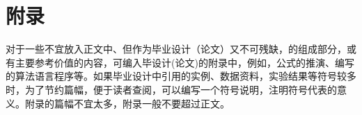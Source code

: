 \section*{附\quad 录}
\renewcommand{\baselinestretch}{1.5}
对于一些不宜放入正文中、但作为毕业设计（论文）又不可残缺，的组成部分，或有主要参考价值的内容，可编入毕设计(论文)的附录中，例如，公式的推演、编写的算法语言程序等。如果毕业设计中引用的实例、数据资料，实验结果等符号较多时，为了节约篇幅，便于读者查阅，可以编写一个符号说明，注明符号代表的意义。附录的篇幅不宜太多，附录一般不要超过正文。\par